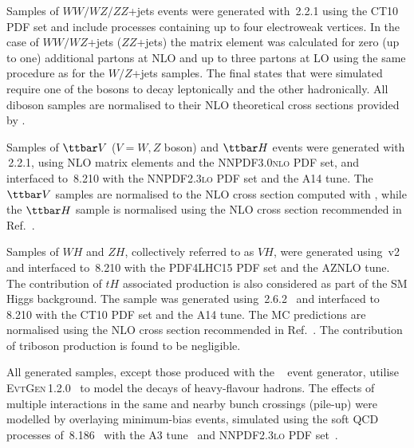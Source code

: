 Samples of $WW/WZ/ZZ$+jets events were generated with {\sherpa}\,2.2.1 using the CT10 PDF set
and include processes containing up to four electroweak vertices. 
In the case of $WW/WZ$+jets ($ZZ$+jets) the matrix element was calculated for zero (up to one) additional partons 
at NLO and up to three partons at LO using the same procedure as for the $W/Z$+jets samples. 
The final states that were simulated require one of the bosons to decay leptonically and the other hadronically.
All diboson samples are normalised to their NLO theoretical cross sections provided by {\sherpa}. 

Samples of $\ttbar V$ ($V=W, Z$ boson) and $\ttbar H$ events were generated with {\amcatnlo}\,2.2.1, using NLO matrix elements and the \textsc{NNPDF3.0nlo} PDF set,
and interfaced to {\pythia}\,8.210 with the \textsc{NNPDF2.3lo} PDF set and the A14 tune. 
The $\ttbar V$ samples are normalised to the NLO cross section computed with {\amcatnlo}, while the $\ttbar H$ sample is normalised using 
the NLO cross section recommended in Ref.~\cite{deFlorian:2016spz}.

Samples of $WH$ and $ZH$, collectively referred to as $VH$, were generated using {\powheg}\,v2~\cite{Frixione:2007nw,Nason:2004rx,Frixione:2007vw,Alioli:2010xd}
and interfaced to {\pythia}\,8.210 with the PDF4LHC15 PDF set and the AZNLO tune.
The contribution of $tH$ associated production is also considered as part of the SM Higgs background.
The sample was generated using {\amcatnlolong}\,2.6.2~\cite{Alwall:2014hca} and interfaced to {\pythia}\,8.210 with the CT10 PDF set
and the A14 tune. The MC predictions are normalised using the NLO cross section recommended in Ref.~\cite{deFlorian:2016spz}.
The contribution of triboson production is found to be negligible.

All generated samples, except those produced with the {\sherpa}~\cite{Gleisberg:2008ta} event generator, 
utilise \textsc{EvtGen}\,1.2.0~\cite{Lange:2001uf} to model the decays of heavy-flavour hadrons. 
The effects of multiple interactions in the same and nearby bunch crossings (pile-up) were modelled by overlaying minimum-bias events, simulated using the soft QCD processes of {\pythia}\,8.186~\cite{Sjostrand:2006za} with the A3 tune~\cite{ATL-PHYS-PUB-2016-017} and \textsc{NNPDF2.3lo} PDF set~\cite{Ball:2012cx}.

